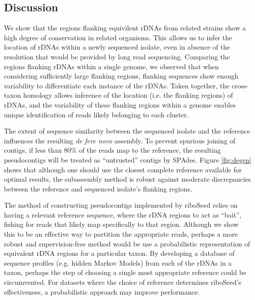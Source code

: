 \documentclass[10pt]{article}
\begin{document}
\begin{linenumbers}
\section*{Discussion}
We show that the regions flanking equivilent rDNAs from related strains show a high degree of conservation in related organisms. This allows us to infer the location of rDNAs within a newly sequenced isolate, even in absence of the resolution that would be provided by long read sequencing. Comparing the regions flanking rDNAs within a single genome, we observed that when considering sufficiently large flanking regions, flanking sequences show enough variability to differentiate each instance of the rDNAs. Taken together, the cross-taxon homology allows inference of the location (i.e. the flanking regions) of rDNAs, and the variability of these flanking regions within a genome enables unique identification of reads likely belonging to each cluster.

The extent of sequence similarity between the sequenced isolate and the reference influences the resulting \textit{de fere novo} assembly. To prevent spurious joining of contigs, if less than 80\% of the reads map to the reference, the resulting pseudocontigs will be treated as ``untrusted'' contigs by SPAdes. Figure \ref{fig:degen} shows that although one should use the closest complete reference available for optimal results, the subassembly method is robust against moderate discrepancies between the reference and sequenced isolate's flanking regions.

The method of constructing pseudocontigs implemented by riboSeed relies on having a relevant reference sequence, where the rDNA regions to act as ``bait'', fishing for reads that likely map specifically to that region. Although we show this to be an effective way to partition the appropriate reads, perhaps a more robust and supervision-free method would be use a probabilistic representation of equivalent rDNA regions for a particular taxon. By developing a database of sequence profiles (e.g. hidden Markov Models) from each of the rDNAs in a taxon, perhaps the step of choosing a single most appropriate reference could be circumvented. For datasets where the choice of reference determines riboSeed's effectiveness, a probabilistic approach may improve performance.



\end{linenumbers}
\end{document}

